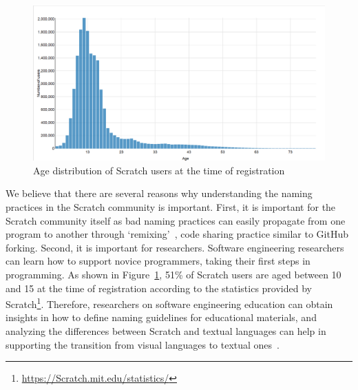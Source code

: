 \documentclass[conference]{IEEEtran}
\newcommand{\todo}[1]{ \textbf{#1} }
\begin{document}
\begin{figure}[tb]
	\begin{center}
		\includegraphics[width=\columnwidth]{fig/Scratch_users}
		\caption{Age distribution of Scratch users at the time of registration}
		\label{fig:Scratch_users}
	\end{center}
\end{figure} 


We believe that there are several reasons why understanding the naming practices in the Scratch community is important.
First, it is important for the Scratch community itself as bad naming practices can easily propagate from one program to another through `remixing'~\cite{Hill:Monroy-Hernandez,Davis:Kafai:Vasudevan:Lee}, code sharing practice similar to GitHub forking.
Second, it is important for researchers. Software engineering researchers can learn how to support novice programmers, taking their first steps in programming. As shown in Figure~\ref{fig:Scratch_users}, 51\% of Scratch users are aged between 10 and 15 at the time of registration according to the statistics provided by Scratch\footnote{\url{https://Scratch.mit.edu/statistics/}}. Therefore, researchers on software engineering education can obtain insights in how to define naming guidelines for educational materials, and analyzing the differences between Scratch and textual languages can help in supporting the transition from visual languages to textual ones~\cite{Dann,Matsuzawa}. 
\end{document}

